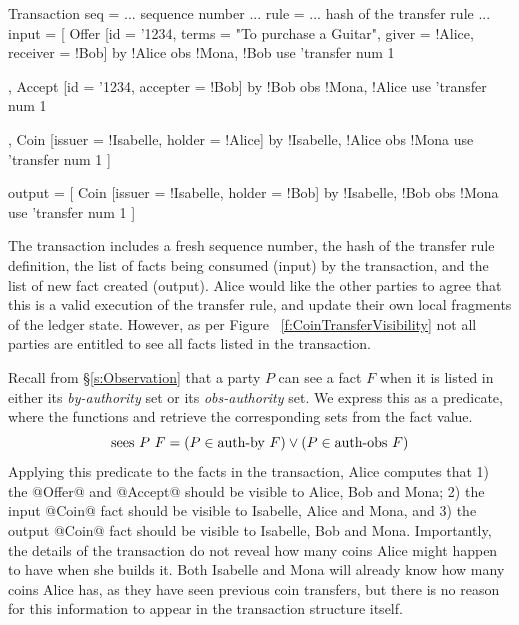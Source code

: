 \begin{small}
\begin{code}
Transaction
 seq    = ... sequence number ...
 rule   = ... hash of the transfer rule ...
 input  = [ Offer [id = '1234, terms = "To purchase a Guitar",
                   giver = !Alice, receiver = !Bob]
            by  {!Alice}            obs {!Mona, !Bob}
            use {'transfer}         num  1

          , Accept [id = '1234, accepter = !Bob]
            by  {!Bob}              obs {!Mona, !Alice}
            use {'transfer}         num 1

          , Coin   [issuer = !Isabelle, holder = !Alice]
            by  {!Isabelle, !Alice} obs {!Mona}
            use {'transfer}         num 1 ]

 output = [ Coin   [issuer = !Isabelle, holder = !Bob]
            by  {!Isabelle, !Bob}   obs {!Mona}
            use {'transfer}         num 1 ]
\end{code}
\end{small}

\eject{}
The transaction includes a fresh sequence number, the hash of the transfer rule definition, the list of facts being consumed (input) by the transaction, and the list of new fact created (output). Alice would like the other parties to agree that this is a valid execution of the transfer rule, and update their own local fragments of the ledger state. However, as per Figure ~\ref{f:CoinTransferVisibility} not all parties are entitled to see all facts listed in the transaction.

Recall from \S\ref{s:Observation} that a party $P$ can see a fact $F$ when it is listed in either its \emph{by-authority} set or its \emph{obs-authority} set. We express this as a predicate, where the functions  and  retrieve the corresponding sets from the fact value.
$$
\textrm{sees}~ P~ F = (P \in \textrm{auth-by}~F) \lor (P \in \textrm{auth-obs}~F)
$$
Applying this predicate to the facts in the transaction, Alice computes that 1) the @Offer@ and @Accept@ should be visible to Alice, Bob and Mona; 2) the input @Coin@ fact should be visible to Isabelle, Alice and Mona, and 3) the output @Coin@ fact should be visible to Isabelle, Bob and Mona. Importantly, the details of the transaction do not reveal how many coins Alice might happen to have when she builds it. Both Isabelle and Mona will already know how many coins Alice has, as they have seen previous coin transfers, but there is no reason for this information to appear in the transaction structure itself.

